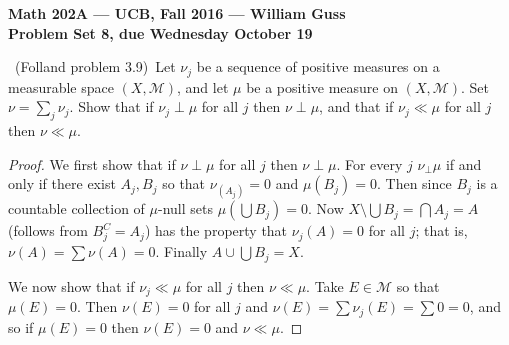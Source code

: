 \documentclass[11pt]{amsart}
\theoremstyle{definition}
\numberwithin{theorem}{section}
\numberwithin{definition}{section}
\numberwithin{equation}{section}
\def\scriptm{{\mathcal M}}
\begin{document}
\begin{center}{\bf Math 202A --- UCB, Fall 2016 --- William Guss}
\\
{\bf Problem Set 8, due Wednesday October 19}
\end{center}

\medskip {}\ (Folland problem 3.9)\ 
Let $\nu_j$ be a sequence of positive measures on a measurable space $(X,\scriptm)$,
and let $\mu$ be a positive measure on $(X,\scriptm)$.
Set $\nu = \sum_j \nu_j$.
Show that if $\nu_j\perp \mu$ for all $j$ then $\nu\perp\mu$,
and that if $\nu_j\ll \mu$ for all $j$ then $\nu\ll\mu$.

\begin{proof}
	We first show that if $\nu \perp \mu$ for all $j$ then $\nu \perp \mu$.
	For every $j$ $\nu_ \perp \mu$ if and only if there exist $A_j, B_j$ so that
	$\nu_(A_j) = 0$ and $\mu(B_j) = 0$. Then since $B_j$ is a countable collection of  $\mu$-null sets
	$\mu(\bigcup B_j) = 0$. Now $X \setminus \bigcup B_j = \bigcap A_j = A$ (follows from $B_j^C = A_j$) has the property that 
	$\nu_j(A) = 0$ for all $j$; that is, $\nu(A) = \sum \nu(A) = 0$. Finally $A \cup \bigcup B_j = X$.

	We now show that if $\nu_j\ll \mu$ for all $j$ then $\nu\ll\mu$. Take $E \in \scriptm$
	so that $\mu(E) = 0$. Then $\nu(E) = 0$ for all $j$ and
	$\nu(E) = \sum \nu_j(E) = \sum 0 = 0$, and so if $\mu(E) = 0$ then $\nu(E) = 0$ and
	$\nu \ll \mu$.
\end{proof}
\end{document}
